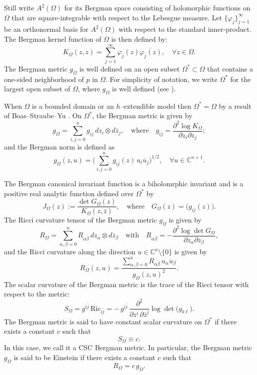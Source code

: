 \documentclass[a4paper,centertags,oneside,12pt]{amsart}
\numberwithin{equation}{section}
\begin{document}
Still write  $A^{2}(\Omega)$  for its Bergman space consisting of holomorphic functions on $\Omega$  that are square-integrable with respect to the Lebesgue measure.    
Let $\{\varphi_{j}\}_{j=1}^\infty$ be an orthonormal basis for  $A^{2}(\Omega)$   with respect to the standard inner-product.
The Bergman kernel  function  of   $\Omega$ is then defined by:
\[
K_{\Omega}(z,{z})=\sum_{j=1}^{\infty}\varphi_{j}(z)\overline{\varphi_{j}(z)},\quad\forall z\in \Omega.
\]
The Bergman metric $g_{\Omega}$ is well defined on an  open subset $\Omega^\ast\subset\Omega$ that contains a one-sided neighborhood of $p$ in $\Omega$. For simplicity of notation, we write $\Omega^*$ for the largest open subset of $\Omega$, where $g_{\Omega}$ is well defined (see \cite{HJL25}).

 When $\Omega$ is a bounded domain or an $h$--extendible model then $\Omega^\ast=\Omega$  by a result of Boas--Straube--Yu \cite{BSY95}.
On $\Omega^\ast$, the Bergman metric is given by
\[
g_{\Omega}=\sum_{i,j=0}^{n}g_{i\overline{j}}\,dz_{i}\otimes d\overline{z}_{j},\quad\text{where}\quad g_{i\overline{j}}=\frac{\partial^{2}\log K_{\Omega}}{\partial z_{i}\partial\overline{z}_{j}};
\]
and the  Bergman  norm  is defined as
\[
g_{\Omega}(z,u)=\biggl(\sum_{i,j=0}^{n}g_{i\overline{j}}(z)\,u_{i}\overline{u}_{j}\biggr)^{1/2},\quad\forall u\in\mathbb{C}^{n+1}.
\]

The Bergman canonical invariant function  is a biholomrphic invariant and is a positive real analytic function defined over $\Omega^*$ by
\[
J_{\Omega}(z):=\frac{\det G_{\Omega}(z)}{K_{\Omega}(z,\overline{z})},\quad\text{where}\quad G_{\Omega}(z)=\bigl(g_{i\overline{j}}(z)\bigr).
\]
The Ricci curvature tensor of the Bergman metric $g_{\Omega}$  is given by
\[
R_{\Omega}=\sum_{\alpha,\beta=0}^{n}R_{\alpha\overline{\beta}}\,dz_{\alpha}\otimes d\overline{z}_{\beta}\quad\text{with}\quad R_{\alpha\overline{\beta}}=-\frac{\partial^{2}\log\det G_{\Omega}}{\partial z_{\alpha}\partial\overline{z}_{\beta}},
\]
and the Ricci curvature along the  direction $u\in\mathbb{C}^{n}\setminus\{0\}$ is given by
\[
R_{\Omega}(z,u)=\frac{\sum_{\alpha,\beta=0}^{n}R_{\alpha\overline{\beta}}\,u_{\alpha}\overline{u}_{\beta}}{g_{\Omega}(z,u)^{2}}.
\]
The scalar curvature of the Bergman metric is the trace of the Ricci tensor with respect to the metric:
$$ 
S_{\Omega}=g^{i\bar{j}} \,\mathrm{Ric}_{i\bar{j}}=
-\,g^{i\bar{j}} \,\frac{\partial^2}{\partial z^i \,\partial \bar{z}^j}
\log \det\bigl(g_{k\bar{\ell}}\bigr).
$$ 
The Bergman metric is said to have constant scalar curvature on $\Omega^\ast$ if there exists a constant $c$ such that $$S_\Omega\equiv c.$$ In this case, we call it a CSC Bergman metric.
In particular, 
the Bergman metric $g_{\Omega}$  is said to be Einstein if there exists a constant $c$ such that
\[
R_{\Omega}=c\,g_{\Omega}.
\]
\end{document}
